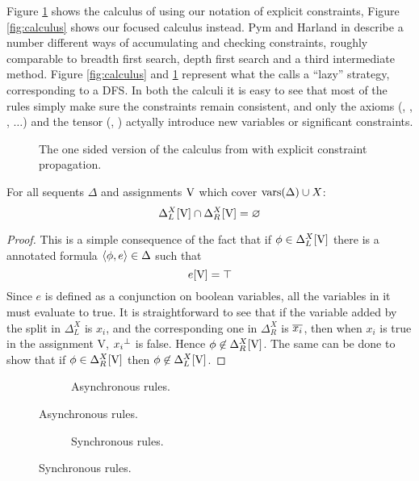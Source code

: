 Figure \ref{fig:hp calculus} shows the calculus of \cite{HarlandPym} using our notation of explicit constraints, Figure \ref{fig:calculus} shows our focused calculus instead.
Pym and Harland in \cite{HarlandPym} describe a number different ways of accumulating and checking constraints, roughly comparable to breadth first search, depth first search and a third intermediate method.
Figure \ref{fig:calculus} and \ref{fig:hp calculus} represent what the \cite{HarlandPym} calls a ``lazy'' strategy, corresponding to a DFS.
In both the calculi it is easy to see that most of the rules simply make sure the constraints remain consistent, and only the axioms (\derRule{\displayid[1]}, \derRule{\displayid[2]}, , $\dots$) and the tensor (\derRule{\displayten}, \derRule[PH]{\displayten}) actyally introduce new variables or significant constraints.
\begin{figure}[h!]
	\centering
	
	\caption{The one sided version of the calculus from \cite{HarlandPym} with explicit constraint propagation.\label{fig:hp calculus}}
\end{figure}
\begin{lemma}
	\label{lemma:cap}
	For all sequents $\Delta$ and assignments $\mathrm{V}$ which cover $\mathrm{vars}(\Delta) \cup X$:
	$$ \Delta_L^X[\mathrm{V}] \cap \Delta_R^X[\mathrm{V}] = \varnothing $$
\end{lemma}
\begin{proof}
	This is a simple consequence of the fact that if $\phi \in \Delta_L^X[\mathrm{V}]$ there is a annotated formula $\langle \phi, e \rangle \in \Delta$ such that 
	$$ e[\mathrm{V}] = \top $$
	Since $e$ is defined as a conjunction on boolean variables, all the variables in it must evaluate to true.
	It is straightforward to see that if the variable added by the split in $\Delta_L^X$ is $x_i$, and the corresponding one in $\Delta_R^X$ is $\overline{x_i}$, then when $x_i$ is true in the assignment V, ${x_i}\!\,^{\bot}$ is false.
	Hence $\phi \not \in \Delta_R^X[\mathrm{V}]$.
	The same can be done to show that if $\phi \in \Delta_R^X[\mathrm{V}]$ then $\phi \not \in \Delta_L^X[\mathrm{V}]$.
\end{proof}
\begin{figure}[H]
	\begin{subfigure}{\textwidth}
		\centering
		
		\caption{Asynchronous rules.\label{fig:asy calculus}}
	\end{subfigure}
\end{figure}
\begin{figure}[H]
	\ContinuedFloat
	\begin{subfigure}{\textwidth}
		\centering
		
		\caption{Synchronous rules.\label{fig:sync calculus}}
	\end{subfigure}
\end{figure}
